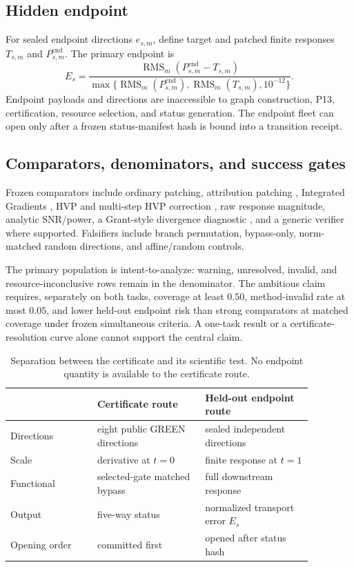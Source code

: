\documentclass{article}
\newcommand{\rms}{\operatorname{RMS}}
\begin{document}
\subsection{Hidden endpoint}
For sealed endpoint directions $e_{s,m}$, define target and patched finite responses $T_{s,m}$ and $P^{\mathrm{end}}_{s,m}$. The primary endpoint is
\begin{equation}
E_s=\frac{\rms_m(P^{\mathrm{end}}_{s,m}-T_{s,m})}
{\max\{\rms_m(P^{\mathrm{end}}_{s,m}),\rms_m(T_{s,m}),10^{-12}\}}.
\label{eq:endpoint}
\end{equation}
Endpoint payloads and directions are inaccessible to graph construction, P13, certification, resource selection, and status generation. The endpoint fleet can open only after a frozen status-manifest hash is bound into a transition receipt.

\subsection{Comparators, denominators, and success gates}
Frozen comparators include ordinary patching, attribution patching \citep{syed2023attribution}, Integrated Gradients \citep{sundararajan2017axiomatic}, HVP and multi-step HVP correction \citep{zhang2026attribution}, raw response magnitude, analytic SNR/power, a Grant-style divergence diagnostic \citep{grant2026addressing}, and a generic verifier where supported. Falsifiers include branch permutation, bypass-only, norm-matched random directions, and affine/random controls.

The primary population is intent-to-analyze: warning, unresolved, invalid, and resource-inconclusive rows remain in the denominator. The ambitious claim requires, separately on both tasks, coverage at least $0.50$, method-invalid rate at most $0.05$, and lower held-out endpoint risk than strong comparators at matched coverage under frozen simultaneous criteria. A one-task result or a certificate-resolution curve alone cannot support the central claim.

\begin{table}[t]
\caption{Separation between the certificate and its scientific test. No endpoint quantity is available to the certificate route.}
\label{tab:firewall}
\centering\small
\begin{tabular}{p{0.25\linewidth}p{0.31\linewidth}p{0.31\linewidth}}
\toprule
 & \textbf{Certificate route} & \textbf{Held-out endpoint route} \\
\midrule
Directions & eight public GREEN directions & sealed independent directions \\
Scale & derivative at $t=0$ & finite response at $t=1$ \\
Functional & selected-gate matched bypass & full downstream response \\
Output & five-way status & normalized transport error $E_s$ \\
Opening order & committed first & opened after status hash \\
\bottomrule
\end{tabular}
\end{table}
\end{document}
